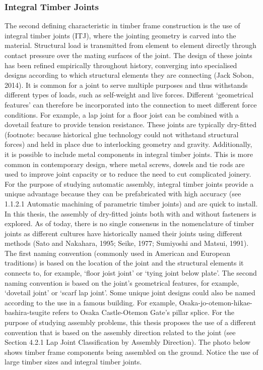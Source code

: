 \subsubsection{Integral Timber Joints}
The second defining characteristic in timber frame construction is the use of integral timber joints (ITJ), where the jointing geometry is carved into the material. Structural load is transmitted from element to element directly through contact pressure over the mating surfaces of the joint. The design of these joints has been refined empirically throughout history, converging into specialised designs according to which structural elements they are connecting (Jack Sobon, 2014). It is common for a joint to serve multiple purposes and thus withstands different types of loads, such as self-weight and live forces. Different ‘geometrical features’ can therefore be incorporated into the connection to meet different force conditions. For example, a lap joint for a floor joist can be combined with a dovetail feature to provide tension resistance. These joints are typically dry-fitted (footnote: because historical glue technology could not withstand structural forces) and held in place due to interlocking geometry and gravity. Additionally, it is possible to include metal components in integral timber joints. This is more common in contemporary design, where metal screws, dowels and tie rods are used to improve joint capacity or to reduce the need to cut complicated joinery. For the purpose of studying automatic assembly, integral timber joints provide a unique advantage because they can be prefabricated with high accuracy (see 1.1.2.1 Automatic machining of parametric timber joints) and are quick to install. In this thesis, the assembly of dry-fitted joints both with and without fasteners is explored.
As of today, there is no single consensus in the nomenclature of timber joints as different cultures have historically named their joints using different methods (Sato and Nakahara, 1995; Seike, 1977; Sumiyoshi and Matsui, 1991). The first naming convention (commonly used in American and European traditions) is based on the location of the joint and the structural elements it connects to, for example, ‘floor joist joint’ or ‘tying joint below plate’. The second naming convention is based on the joint's geometrical features, for example, ‘dovetail joint’ or ‘scarf lap joint’. Some unique joint designs could also be named according to the use in a famous building. For example, Osaka-jo-otemon-hikae-bashira-tsugite refers to Osaka Castle-Otemon Gate's pillar splice. For the purpose of studying assembly problems, this thesis proposes the use of a different convention that is based on the assembly direction related to the joint (see Section 4.2.1 Lap Joint Classification by Assembly Direction).
The photo below shows timber frame components being assembled on the ground. Notice the use of large timber sizes and integral timber joints. 

